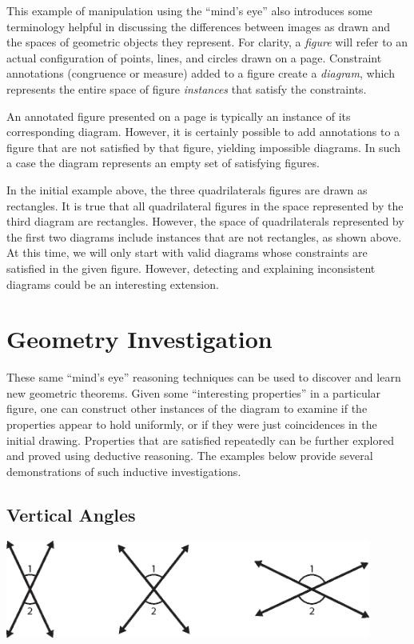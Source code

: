 This example of manipulation using the ``mind's eye'' also introduces
some terminology helpful in discussing the differences between images
as drawn and the spaces of geometric objects they represent.  For
clarity, a \emph{figure} will refer to an actual configuration of
points, lines, and circles drawn on a page.  Constraint annotations
(congruence or measure) added to a figure create a \emph{diagram},
which represents the entire space of figure \emph{instances} that
satisfy the constraints.

An annotated figure presented on a page is typically an instance of
its corresponding diagram.  However, it is certainly possible to add
annotations to a figure that are not satisfied by that figure,
yielding impossible diagrams.  In such a case the diagram represents
an empty set of satisfying figures.

In the initial example above, the three quadrilaterals figures are
drawn as rectangles.  It is true that all quadrilateral figures in the
space represented by the third diagram are rectangles.  However, the
space of quadrilaterals represented by the first two diagrams include
instances that are not rectangles, as shown above.  At this time, we
will only start with valid diagrams whose constraints are satisfied in
the given figure.  However, detecting and explaining inconsistent
diagrams could be an interesting extension.

\section{Geometry Investigation}

These same ``mind's eye'' reasoning techniques can be used to discover
and learn new geometric theorems.  Given some ``interesting
properties'' in a particular figure, one can construct other instances
of the diagram to examine if the properties appear to hold uniformly,
or if they were just coincidences in the initial drawing.  Properties
that are satisfied repeatedly can be further explored and proved using
deductive reasoning.  The examples below provide several
demonstrations of such inductive investigations.

\subsection{Vertical Angles}

\begin{center}
\includegraphics[width=0.9\textwidth]{diagrams/vertical.eps}
\end{center}

